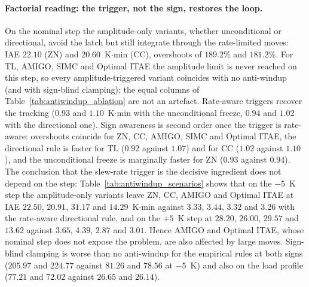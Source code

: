 \documentclass[11pt]{article}
\begin{document}
\paragraph{Factorial reading: the trigger, not the sign, restores the loop.} On the nominal step the amplitude-only variants, whether unconditional or directional, avoid the latch but still integrate through the rate-limited moves: IAE $22.10$ (ZN) and $20.60$~K$\cdot$min (CC), overshoots of $189.2\%$ and $181.2\%$. For TL, AMIGO, SIMC and Optimal ITAE the amplitude limit is never reached on this step, so every amplitude-triggered variant coincides with no anti-windup (and with sign-blind clamping); the equal columns of Table~\ref{tab:antiwindup_ablation} are not an artefact. Rate-aware triggers recover the tracking ($0.93$ and $1.10$~K$\cdot$min with the unconditional freeze, $0.94$ and $1.02$ with the directional one). Sign awareness is second order once the trigger is rate-aware: overshoots coincide for ZN, CC, AMIGO, SIMC and Optimal ITAE, the directional rule is faster for TL ($0.92$ against $1.07$) and for CC ($1.02$ against $1.10$), and the unconditional freeze is marginally faster for ZN ($0.93$ against $0.94$). The conclusion that the slew-rate trigger is the decisive ingredient does not depend on the step: Table~\ref{tab:antiwindup_scenarios} shows that on the $-5$~K step the amplitude-only variants leave ZN, CC, AMIGO and Optimal ITAE at IAE $22.50$, $20.91$, $31.17$ and $14.29$~K$\cdot$min against $3.33$, $3.44$, $3.32$ and $3.26$ with the rate-aware directional rule, and on the $+5$~K step at $28.20$, $26.00$, $29.57$ and $13.62$ against $3.65$, $4.39$, $2.87$ and $3.01$. Hence AMIGO and Optimal ITAE, whose nominal step does not expose the problem, are also affected by large moves. Sign-blind clamping is worse than no anti-windup for the empirical rules at both signs ($205.97$ and $224.77$ against $81.26$ and $78.56$ at $-5$~K) and also on the load profile ($77.21$ and $72.02$ against $26.65$ and $26.14$).
\end{document}
